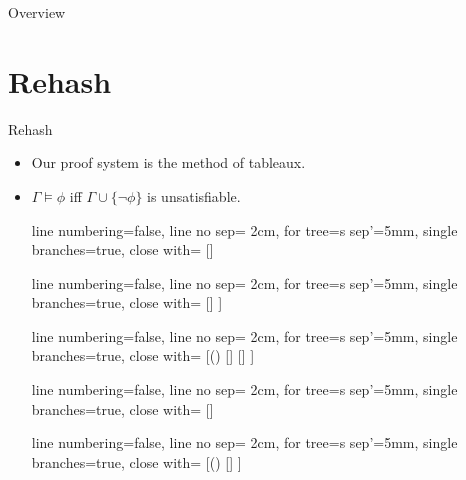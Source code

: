 \setcounter{framenumber}{200}
\begin{frame}
  \maketitle
\end{frame}

\begin{frame}{Overview}
\tableofcontents
\end{frame}

\section{Rehash}
\begin{frame}{Rehash}
	
\begin{itemize}

	\item Our proof system is the method of tableaux.

	\item $\Gamma\vDash\phi$ iff $\Gamma\cup\{\neg\phi\}$ is unsatisfiable.
	
	{\tiny\begin{center}
					
					\begin{prooftree}
					{
					line numbering=false,
					line no sep= 2cm,
					for tree={s sep'=5mm},
					single branches=true,
					close with=\xmark
					}
					[\neg\neg \phi [\phi ] ]
					\end{prooftree}
					\begin{prooftree}
					{
					line numbering=false,
					line no sep= 2cm,
					for tree={s sep'=5mm},
					single branches=true,
					close with=\xmark
					}
					[\phi\land\psi [\phi [\psi ] ] ]
					\end{prooftree}
					\begin{prooftree}
					{
					line numbering=false,
					line no sep= 2cm,
					for tree={s sep'=5mm},
					single branches=true,
					close with=\xmark
					}
					[\neg (\phi\land\psi) [\neg \phi ] [\neg \psi ] ]
					\end{prooftree}
					\begin{prooftree}
					{
					line numbering=false,
					line no sep= 2cm,
					for tree={s sep'=5mm},
					single branches=true,
					close with=\xmark
					}
					[\phi\lor\psi [\phi ] [\psi ] ]
					\end{prooftree}
					\begin{prooftree}
					{
					line numbering=false,
					line no sep= 2cm,
					for tree={s sep'=5mm},
					single branches=true,
					close with=\xmark
					}
					[\neg(\phi\lor\psi) [\neg\phi [\neg\psi ] ] ]
					\end{prooftree}


\end{center}}
\end{itemize}
\end{frame}
